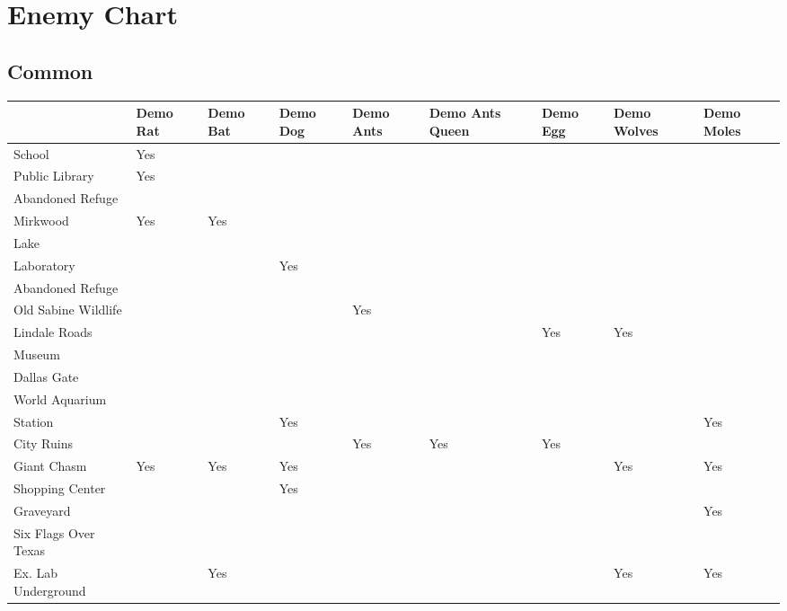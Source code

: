 \section{Enemy Chart}

\vspace*{0.2cm}

\subsection{Common}

\vspace*{0.2cm}

\begin{center}
	\begin{tabular}[c]{| p{3.8cm} | p{1cm} | p{1cm} | p{1cm} | p{1cm} | p{1.7cm} | p{1cm} | p{1cm} | p{1cm} | }
		\hline
								& Demo Rat	& Demo Bat	& Demo Dog	& Demo Ants	& Demo Ants Queen	& Demo Egg		& Demo Wolves	& Demo Moles	\\
		\hline
		School					& Yes		&			&	 		&	 		&					&				&		 		&				\\
		\hline
		Public Library	 		& Yes 		& 			& 			&			&					&				&				&				\\
		\hline
		Abandoned Refuge 		& 			&			&			&			&					&				&				&				\\
		\hline
		Mirkwood				& Yes 		& Yes		&			&			&					&				&				&				\\
		\hline
		Lake 					& 			&			&			&			&					&				&				&				\\
		\hline
		Laboratory 				& 			&			& Yes		&			&					&				&				&				\\
		\hline
		Abandoned Refuge 		& 			&			&			&			&					&				&				&				\\
		\hline
		Old Sabine Wildlife		& 			&			&			& Yes		&					&				&				&				\\
		\hline
		Lindale Roads			& 			&			&			&			&					& Yes			& Yes			&				\\
		\hline
 		Museum					& 			&			&			&			&					&				&				&				\\
		\hline
		Dallas Gate				&			&			&			&			&					&				&				&				\\
		\hline
		World Aquarium			& 			&			&			&			&					&				&				&				\\
		\hline
		Station					& 			&			& Yes		&			&					&				&				& Yes			\\
		\hline
		City Ruins				& 			&			& 			& Yes		& Yes				& Yes			& 				&				\\
		\hline \rowcolor{light-light-gray}
		Giant Chasm				& Yes 		& Yes		& Yes		&		&			& 			& Yes			& Yes			\\
		\hline
		Shopping Center 		& 			&			& Yes		&			&					&				&				&				\\
		\hline
		Graveyard				& 			&			&			&			&					&				&				& Yes			\\
		\hline
		Six Flags Over Texas	& 			&			&			&			&					&				&				&				\\
		\hline
		Ex. Lab Underground		&			& Yes		&			&			&					&				& Yes			& Yes			\\
		\hline
	\end{tabular}
\end{center}

